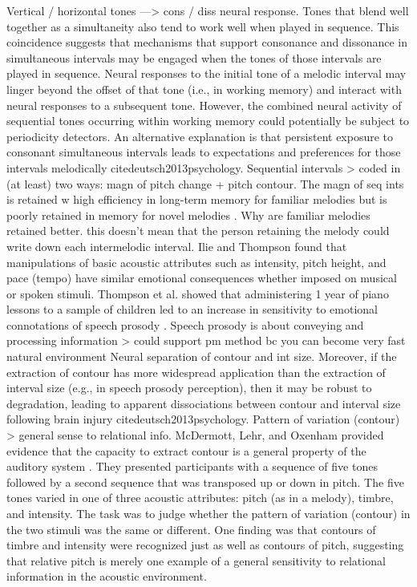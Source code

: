 Vertical / horizontal tones —> cons / diss neural response. Tones that blend well together as a simultaneity also tend to work well when played in sequence. This coincidence suggests that mechanisms that support consonance and dissonance in simultaneous intervals may be engaged when the tones of those intervals are played in sequence. Neural responses to the initial tone of a melodic interval may linger beyond the offset of that tone (i.e., in working memory) and interact with neural responses to a subsequent tone. However, the combined neural activity of sequential tones occurring within working memory could potentially be subject to periodicity detectors. An alternative explanation is that persistent exposure to consonant simultaneous intervals leads to expectations and preferences for those intervals melodically cite{deutsch2013psychology}. Sequential intervals > coded in (at least) two ways: magn of pitch change + pitch contour. The magn of seq ints is retained w high efficiency in long-term memory for familiar melodies \cite{attneave1971pitch} \cite{dowling1981importance} but is poorly retained in memory for novel melodies \cite{dowling1978scale}. Why are familiar melodies retained better. this doesn't mean that the person retaining the melody could write down each intermelodic interval.
Ilie and Thompson \cite{ilie2006comparison} \cite{ilie2011experiential} found that manipulations of basic acoustic attributes such as intensity, pitch height, and pace (tempo) have similar emotional consequences whether imposed on musical or spoken stimuli. Thompson et al. showed that administering 1 year of piano lessons to a sample of children led to an increase in sensitivity to emotional connotations of speech prosody \cite{husain20wf}. Speech prosody is about conveying and processing information > could support pm method bc you can become very fast natural environment
Neural separation of contour and int size. Moreover, if the extraction of contour has more widespread application than the extraction of interval size (e.g., in speech prosody perception), then it may be robust to degradation, leading to apparent dissociations between contour and interval size following brain injury cite{deutsch2013psychology}.
Pattern of variation (contour) > general sense to relational info. McDermott, Lehr, and Oxenham provided evidence that the capacity to extract contour is a general property of the auditory system \cite{mcdermott2008music}. They presented participants with a sequence of five tones followed by a second sequence that was transposed up or down in pitch. The five tones varied in one of three acoustic attributes: pitch (as in a melody), timbre, and intensity. The task was to judge whether the pattern of variation (contour) in the two stimuli was the same or different. One finding was that contours of timbre and intensity were recognized just as well as contours of pitch, suggesting that relative pitch is merely one example of a general sensitivity to relational information in the acoustic environment.
